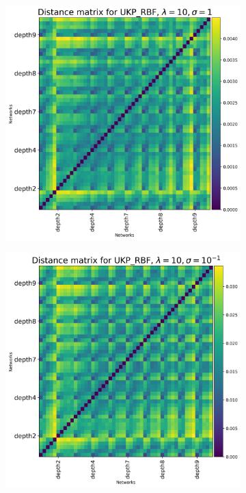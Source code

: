\documentclass[11pt]{article}
\theoremstyle{plain}
\begin{document}
\begin{figure}[!h]
    \begin{subfigure}[b]{0.3\textwidth}
        \includegraphics[width=\textwidth]{Appendix figures/mnist_experiments/Heatmaps/Heatmap for UKP_dist_RBF_1.000000e+01_1.000000e+00.png}
    \end{subfigure}
    \hfill
    \begin{subfigure}[b]{0.3\textwidth}
        \includegraphics[width=\textwidth]{Appendix figures/mnist_experiments/Heatmaps/Heatmap for UKP_dist_RBF_1.000000e+01_1.000000e-01.png}

\end{subfigure}
\end{figure}
\end{document}
